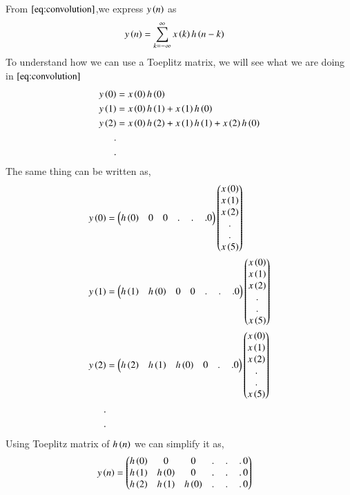 \documentclass[journal,12pt,twocolumn]{IEEEtran}
\renewcommand\thesection{\arabic{section}}
\begin{document}
\begin{enumerate}[label=\thesection.\arabic*]
      From $\eqref{eq:convolution}$,we express $y\left(n\right)$ as
      \begin{align}
        y\left(n\right) &= \sum_{k = -\infty}^{\infty}x\left(k\right)h\left(n-k\right)
      \end{align}
      To understand how we can use a Toeplitz matrix, we will see what we are doing in $\eqref{eq:convolution}$ 
      \begin{align}
        y\left(0\right) &= x\left(0\right)h\left(0\right)\\
        y\left(1\right) &= x\left(0\right)h\left(1\right) + x\left(1\right)h\left(0\right)\\
        y\left(2\right) &= x\left(0\right)h\left(2\right) + x\left(1\right)h\left(1\right) + x\left(2\right)h\left(0\right)\\
        . \nonumber&\\ 
        .& \nonumber
      \end{align}
      The same thing can be written as,
      \begin{align}
        y\left(0\right) &= \begin{pmatrix}h\left(0\right) & 0 & 0 &.\,&.\,&.0\end{pmatrix}\begin{pmatrix}x\left(0\right)\\x\left(1\right)\\x\left(2\right)\\ . \\.\\x\left(5\right)\end{pmatrix}\\
        y\left(1\right) &= \begin{pmatrix}h\left(1\right) & h\left(0\right) & 0 & 0 &.\,&.\,&.0\end{pmatrix}\begin{pmatrix}x\left(0\right)\\x\left(1\right)\\x\left(2\right)\\ . \\.\\x\left(5\right)\end{pmatrix}\\
        y\left(2\right) &= \begin{pmatrix}h\left(2\right) & h\left(1\right) & h\left(0\right) & 0& .\,&.0\end{pmatrix}\begin{pmatrix}x\left(0\right)\\x\left(1\right)\\x\left(2\right)\\ . \\.\\x\left(5\right)\end{pmatrix}\\
        . & \nonumber \\
        .& \nonumber
      \end{align}
      Using Toeplitz matrix of $h\left(n\right)$ we can simplify it as,
      \begin{align}
        y\left(n\right) &= \begin{pmatrix}h\left(0\right) & 0 & 0 &.\,&.\,&.\,0 \\
          h\left(1\right) & h\left(0\right) & 0 & .\,&.\,&.\,0 \\
          h\left(2\right) & h\left(1\right) & h\left(0\right) & .\,&.\,&.\,0 \\
\end{pmatrix}
\end{align}
\end{enumerate}
\end{document}
